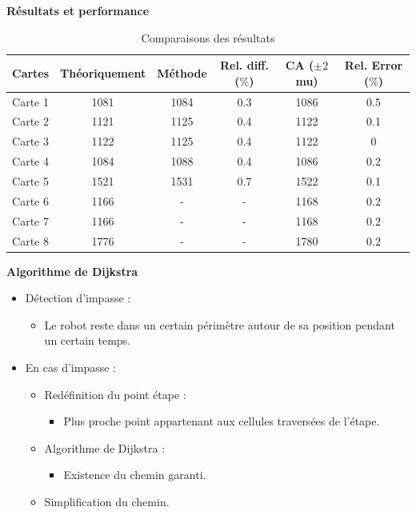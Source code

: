 \documentclass[aspectratio=169,10pt]{beamer}
\begin{document}
\begin{frame}{\textbf{Résultats et performance}}
    \begin{table}[H]
		\centering
		\begin{tabular}{c c c c c c}
			\hline
			Cartes & Théoriquement & Méthode & Rel. diff. ($\%$) & CA ($\pm 2$ mu) & Rel. Error ($\%$)\\
			\hline
			Carte 1 & 1081 & 1084 & 0.3 & 1086 & 0.5\\
			Carte 2 & 1121 & 1125 & 0.4 & 1122 & 0.1\\
			Carte 3 & 1122 & 1125 & 0.4 & 1122 & 0\\
			Carte 4 & 1084 & 1088 & 0.4 & 1086 & 0.2\\
			Carte 5 & 1521 & 1531 & 0.7 & 1522 & 0.1\\
			Carte 6 & 1166 & - & - & 1168 & 0.2\\
			Carte 7 & 1166 & - & - & 1168 & 0.2\\
			Carte 8 & 1776 & - & - & 1780 & 0.2\\
			\hline
		\end{tabular}
		\caption{Comparaisons des résultats}
		\label{tab:benchmark_results}
	\end{table}
\end{frame}

\begin{frame}{\textbf{Algorithme de Dijkstra}}
	\begin{itemize}
		\item Détection d'impasse :
		\vspace{0.2cm}
		\begin{itemize}
			\item Le robot reste dans un certain périmètre autour de sa position pendant un certain temps.
		\end{itemize}
		\vspace{0.2cm}
		\item En cas d'impasse :
		\vspace{0.2cm}
		\begin{itemize}
			\item Redéfinition du point étape :
			\vspace{0.2cm}
			\begin{itemize}
				\item Plus proche point appartenant aux cellules traversées de l'étape.
			\end{itemize}
			\vspace{0.2cm}
			\item Algorithme de Dijkstra :
			\vspace{0.2cm}
			\begin{itemize}
				\item Existence du chemin garanti.
			\end{itemize}
			\vspace{0.2cm}
			\item Simplification du chemin.
		\end{itemize}
	\end{itemize}

\end{frame}
\end{document}
